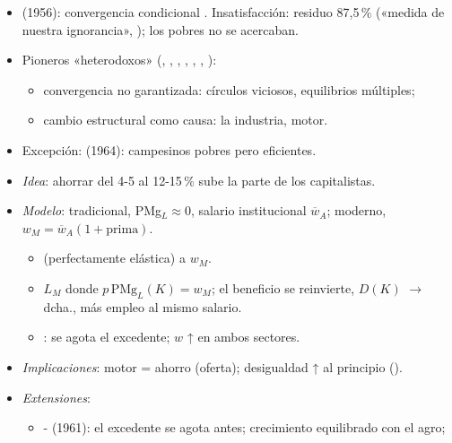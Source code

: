 \documentclass{article}
\begin{document}
\begin{columnas}
\begin{itemize}
\item {} (1956): convergencia condicional . Insatisfacción: residuo 87,5\,\% («medida de nuestra ignorancia», ); los pobres no se acercaban.
\item Pioneros «heterodoxos» (, , , , , , ):
  \begin{itemize}
  \item convergencia no garantizada: círculos viciosos, equilibrios múltiples;
  \item cambio estructural como causa: la industria, motor.
  \end{itemize}
\item Excepción:  (1964): campesinos pobres pero eficientes.
\end{itemize}
\begin{itemize}
\item \emph{Idea}: ahorrar del 4-5 al 12-15\,\% sube la parte de los capitalistas.
\item \emph{Modelo}: tradicional, PMg$_L\approx0$, salario institucional $\overline w_A$; moderno, $w_M=\overline w_A(1+\text{prima})$.
  \begin{itemize}
  \item {} (perfectamente elástica) a $w_M$.
  \item $L_M$ donde $p\,\mathrm{PMg}_L(K)=w_M$; el beneficio se reinvierte, $D(K)$ $\to$ dcha., más empleo al mismo salario.
  \item {}: se agota el excedente; $w$ ↑ en ambos sectores.
  \end{itemize}
\end{itemize}
\begin{itemize}
\item \emph{Implicaciones}: motor = ahorro (oferta); desigualdad ↑ al principio ().
\item \emph{Extensiones}:
  \begin{itemize}
  \item {}- (1961): el excedente se agota antes; crecimiento equilibrado con el agro;

\end{itemize}
\end{itemize}
\end{columnas}
\end{document}
